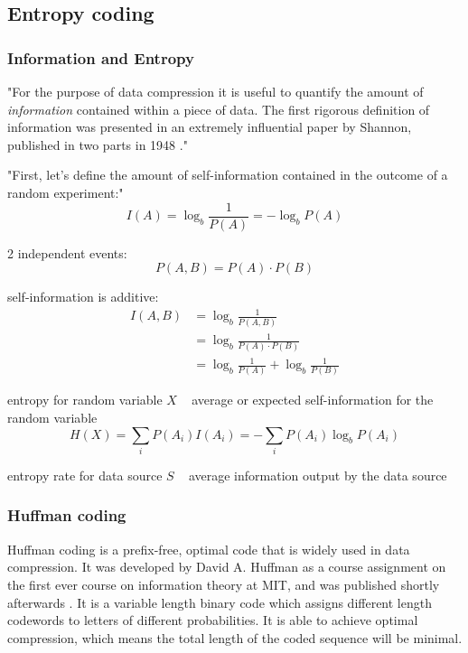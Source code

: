   \subsection{Entropy coding}
    \subsubsection{Information and Entropy}
      "For the purpose of data compression it is useful to quantify the amount of \textit{information} contained within a piece of data. The first rigorous definition of information was presented in an extremely influential paper by Shannon, published in two parts in 1948 \cite{shannon_mathematical_1948, shannon_mathematical_1948-1}."

      "First, let's define the amount of self-information contained in the outcome of a random experiment:"
      \begin{equation}
        I(A) = \log_b \frac{1}{P(A)} = - \log_b P(A)
      \end{equation}

      2 independent events:
      \begin{equation}
        P(A,B) = P(A) \cdot P(B)
      \end{equation}

      self-information is additive:
      \begin{align}
        I(A,B) &= \log_b \frac{1}{P(A,B)} \\
        &= \log_b \frac{1}{P(A) \cdot P(B)} \\
        &= \log_b \frac{1}{P(A)} + \log_b \frac{1}{P(B)}
      \end{align}

      entropy for random variable $X$ ~ average or expected self-information for the random variable
      \begin{equation}
        H(X) = \sum_i P(A_i)I(A_i) = - \sum_i P(A_i) \log_b P(A_i)
      \end{equation}

      entropy rate for data source $S$ ~ average information output by the data source

    \subsubsection{Huffman coding}
      Huffman coding is a prefix-free, optimal code that is widely used in data compression. It was developed by David A. Huffman as a course assignment on the first ever course on information theory at MIT, and was published shortly afterwards \cite{huffman_method_1952}. It is a variable length binary code which assigns different length codewords to letters of different probabilities. It is able to achieve optimal compression, which means the total length of the coded sequence will be minimal.

